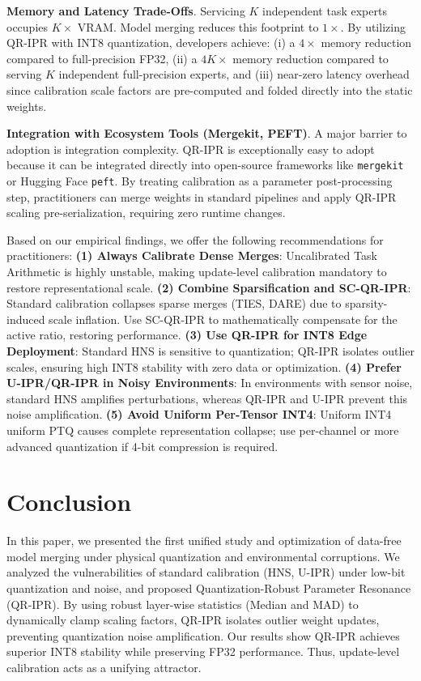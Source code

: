 \documentclass{article}
\theoremstyle{plain}
\theoremstyle{definition}
\theoremstyle{remark}
\begin{document}
\textbf{Memory and Latency Trade-Offs}.  Servicing $K$ independent task experts occupies $K\times$ VRAM. Model merging reduces this footprint to $1\times$. By utilizing QR-IPR with INT8 quantization, developers achieve: (i) a $4\times$ memory reduction compared to full-precision FP32, (ii) a $4K\times$ memory reduction compared to serving $K$ independent full-precision experts, and (iii) near-zero latency overhead since calibration scale factors are pre-computed and folded directly into the static weights.

\textbf{Integration with Ecosystem Tools (Mergekit, PEFT)}.  A major barrier to adoption is integration complexity. QR-IPR is exceptionally easy to adopt because it can be integrated directly into open-source frameworks like \texttt{mergekit} or Hugging Face \texttt{peft}. By treating calibration as a parameter post-processing step, practitioners can merge weights in standard pipelines and apply QR-IPR scaling pre-serialization, requiring zero runtime changes.

Based on our empirical findings, we offer the following recommendations for practitioners:
\textbf{(1) Always Calibrate Dense Merges}: Uncalibrated Task Arithmetic is highly unstable, making update-level calibration mandatory to restore representational scale.
\textbf{(2) Combine Sparsification and SC-QR-IPR}: Standard calibration collapses sparse merges (TIES, DARE) due to sparsity-induced scale inflation. Use SC-QR-IPR to mathematically compensate for the active ratio, restoring performance.
\textbf{(3) Use QR-IPR for INT8 Edge Deployment}: Standard HNS is sensitive to quantization; QR-IPR isolates outlier scales, ensuring high INT8 stability with zero data or optimization.
\textbf{(4) Prefer U-IPR/QR-IPR in Noisy Environments}: In environments with sensor noise, standard HNS amplifies perturbations, whereas QR-IPR and U-IPR prevent this noise amplification.
\textbf{(5) Avoid Uniform Per-Tensor INT4}: Uniform INT4 uniform PTQ causes complete representation collapse; use per-channel or more advanced quantization if 4-bit compression is required.

\vspace{-2.0mm}
\section{Conclusion}
\label{sec:conclusion}
\vspace{-2.5mm}

In this paper, we presented the first unified study and optimization of data-free model merging under physical quantization and environmental corruptions. We analyzed the vulnerabilities of standard calibration (HNS, U-IPR) under low-bit quantization and noise, and proposed Quantization-Robust Parameter Resonance (QR-IPR). By using robust layer-wise statistics (Median and MAD) to dynamically clamp scaling factors, QR-IPR isolates outlier weight updates, preventing quantization noise amplification. Our results show QR-IPR achieves superior INT8 stability while preserving FP32 performance. Thus, update-level calibration acts as a unifying attractor.

\clearpage
\setlength{\bibsep}{3.0pt}


\end{document}

